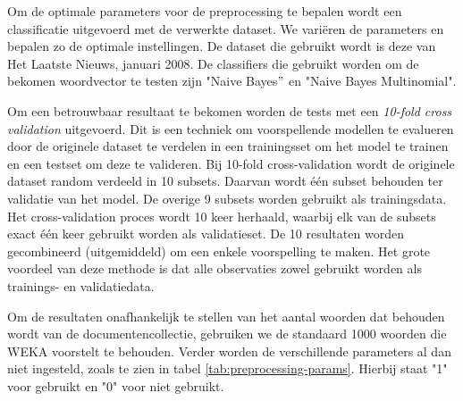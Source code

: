 Om de optimale parameters voor de preprocessing te bepalen wordt een classificatie uitgevoerd met de verwerkte dataset. We vari\"eren de parameters en bepalen zo de optimale instellingen. De dataset die gebruikt wordt is deze van Het Laatste Nieuws, januari 2008. De classifiers die gebruikt worden om de bekomen woordvector te testen zijn "Naive Bayes$"$ en "Naive Bayes Multinomial". 

Om een betrouwbaar resultaat te bekomen worden de tests met een \textit{10-fold cross validation}\label{10-fold-cv} uitgevoerd. Dit is een techniek om voorspellende modellen te evalueren door de originele dataset te verdelen in een trainingsset om het model te trainen en een testset om deze te valideren. Bij 10-fold cross-validation\label{cross-val} wordt de originele dataset random verdeeld in 10 subsets. Daarvan wordt \'e\'en subset behouden ter validatie van het model. De overige 9 subsets worden gebruikt als trainingsdata. Het cross-validation proces wordt 10 keer herhaald, waarbij elk van de subsets exact \'e\'en keer gebruikt worden als validatieset. De 10 resultaten worden gecombineerd (uitgemiddeld) om een enkele voorspelling te maken. Het grote voordeel van deze methode is dat alle observaties zowel gebruikt worden als trainings- en validatiedata. 

Om de resultaten onafhankelijk te stellen van het aantal woorden dat behouden wordt van de documentencollectie, gebruiken we de standaard 1000 woorden die WEKA voorstelt te behouden. Verder worden de verschillende parameters al dan niet ingesteld, zoals te zien in tabel \ref{tab:preprocessing-params}. Hierbij staat "1" voor gebruikt en "0" voor niet gebruikt. 


